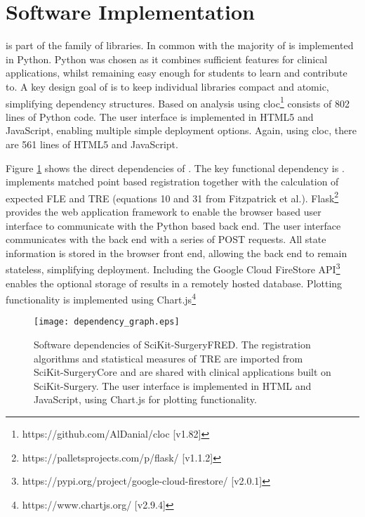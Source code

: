 \section{Software Implementation}
\fred is part of the \sksurgery\cite{PMID:32436132} family of libraries. In common with \sksurgery the majority of \fred is implemented in Python. Python was chosen as it combines sufficient features for clinical
applications, whilst remaining easy enough for students to learn and contribute to. A key design goal of 
\sksurgery is to keep individual libraries compact and atomic, simplifying dependency structures. Based on 
analysis using cloc\footnote{https://github.com/AlDanial/cloc [v1.82]} \fred consists of 802 lines of Python 
code. The user interface is implemented in HTML5 and JavaScript, enabling multiple simple deployment 
options. Again, using cloc, there are 561 lines of HTML5 and JavaScript.

Figure \ref{fig:dependencies} shows the direct dependencies of \fred. The key functional dependency is
\core\cite{matt_clarkson_2020_3965731}. \core implements matched point based registration \cite{Arun1987} together 
with the calculation of expected \gls{FLE} and \gls{TRE} (equations 10 and 31 from Fitzpatrick et al.\cite{Fitzpatrick1998}). Flask\footnote{https://palletsprojects.com/p/flask/ [v1.1.2]} provides the web application framework 
to enable the browser based user interface to communicate with the Python based back end. The user
interface communicates with the back end with a series of {POST} requests. All state information is stored in the 
browser front end, allowing the back end to remain stateless, simplifying deployment. 
Including the Google Cloud FireStore API\footnote{https://pypi.org/project/google-cloud-firestore/ [v2.0.1]} 
enables the optional storage of results in a remotely hosted database. Plotting functionality is implemented
using Chart.js\footnote{https://www.chartjs.org/ [v2.9.4]}

\begin{figure}
	\begin{center}
	\texttt{[image: dependency\_graph.eps]}
		\caption{\label{fig:dependencies}Software dependencies of SciKit-SurgeryFRED. The registration algorithms and statistical measures of {TRE} are imported from SciKit-SurgeryCore and are shared with clinical applications built on SciKit-Surgery. The user interface is implemented in HTML and JavaScript, using Chart.js for plotting functionality.}
	\end{center}
\end{figure}

